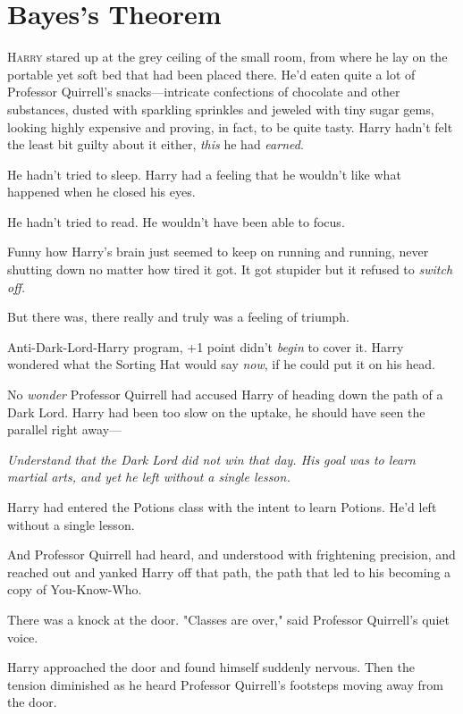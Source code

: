 \chapter{Bayes's Theorem}

\lettrine{H}{arry} stared up at the grey ceiling of the small room, from where he lay on the
portable yet soft bed that had been placed there. He'd eaten quite a lot of
Professor Quirrell's snacks—intricate confections of chocolate and other
substances, dusted with sparkling sprinkles and jeweled with tiny sugar gems,
looking highly expensive and proving, in fact, to be quite tasty. Harry hadn't
felt the least bit guilty about it either, \emph{this} he had \emph{earned}.

He hadn't tried to sleep. Harry had a feeling that he wouldn't like what
happened when he closed his eyes.

He hadn't tried to read. He wouldn't have been able to focus.

Funny how Harry's brain just seemed to keep on running and running, never
shutting down no matter how tired it got. It got stupider but it refused to
\emph{switch off.}

But there was, there really and truly was a feeling of triumph.

Anti-Dark-Lord-Harry program, +1 point didn't \emph{begin} to cover it. Harry
wondered what the Sorting Hat would say \emph{now}, if he could put it on his
head.

No \emph{wonder} Professor Quirrell had accused Harry of heading down the path
of a Dark Lord. Harry had been too slow on the uptake, he should have seen the
parallel right away—

\emph{Understand that the Dark Lord did not win that day. His goal was to learn
martial arts, and yet he left without a single lesson.}

Harry had entered the Potions class with the intent to learn Potions. He'd left
without a single lesson.

And Professor Quirrell had heard, and understood with frightening precision,
and reached out and yanked Harry off that path, the path that led to his
becoming a copy of You-Know-Who.

There was a knock at the door. "Classes are over," said Professor Quirrell's
quiet voice.

Harry approached the door and found himself suddenly nervous. Then the tension
diminished as he heard Professor Quirrell's footsteps moving away from the door.

